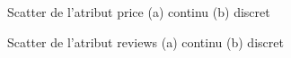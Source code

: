 \begin{figure}[H]
	\centering
	 \caption{Scatter de l'atribut price (a) continu (b) discret}
	\label{fig:price}
\end{figure}
\begin{figure}[H]
	\centering
	\caption{Scatter de l'atribut reviews (a) continu (b) discret}
	\label{fig:reviews}
\end{figure}
